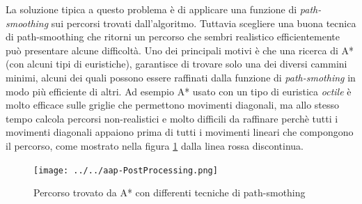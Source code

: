 \documentclass[11pt]{book}
\begin{document}
\par{
La soluzione tipica a questo problema \`e di applicare una funzione di \emph{path-smoothing} sui percorsi trovati dall'algoritmo. Tuttavia scegliere una buona tecnica di path-smoothing che ritorni un percorso che sembri realistico efficientemente pu\`o presentare alcune difficolt\`a. Uno dei principali motivi \`e che una ricerca di A* (con alcuni tipi di euristiche), garantisce di trovare solo una dei diversi cammini minimi, alcuni dei quali possono essere raffinati dalla funzione di \emph{path-smothing} in modo pi\`u efficiente di altri. Ad esempio A* usato con un tipo di euristica \emph{octile} \`e molto efficace sulle griglie che permettono movimenti diagonali, ma allo stesso tempo calcola percorsi non-realistici e molto difficili da raffinare perch\`e tutti i movimenti diagonali appaiono prima di tutti i movimenti lineari che compongono il percorso, come mostrato nella figura \ref{img7} dalla linea rossa discontinua.
\begin{figure}[htp]
\centering
\texttt{[image: ../../aap-PostProcessing.png]}
\caption{Percorso trovato da A* con differenti tecniche di path-smothing}
\label{img7}
\end{figure}
}

\begin{algorithm}
\PrintSemicolon
\caption{Line of Sight pt. 1}
  \LinesNumbered


\end{algorithm}
\end{document}

